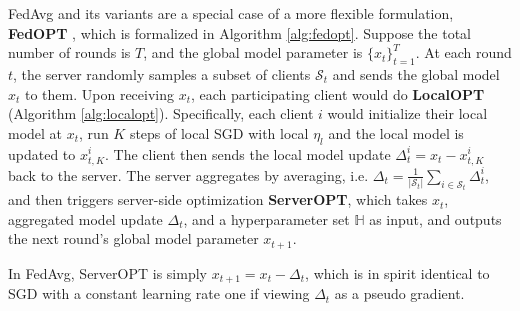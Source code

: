 FedAvg \citep{McMahan2017FedAvg} and its variants are a special case of a more flexible formulation, \textbf{FedOPT} \citep{reddi2020adaptive}, which is formalized in Algorithm \ref{alg:fedopt}. Suppose the total number of rounds is $T$, and the global model parameter is $\{x_t\}_{t=1}^T$. At each round $t$, the server randomly samples a subset of clients $\mathcal{S}_t$ and sends the global model $x_t$ to them. Upon receiving $x_t$, each participating client would do \textbf{LocalOPT} (Algorithm \ref{alg:localopt}). Specifically, each client $i$ would initialize their local model at $x_t$, run $K$ steps of local SGD with local $\eta_l$ and the local model is updated to $x_{t,K}^i$. The client then sends the local model update $\Delta_t^i=x_t-x_{t,K}^i$ back to the server. The server aggregates by averaging, i.e. $\Delta_t=\frac{1}{\lvert \mathcal{S}_t\rvert}\sum_{i\in \mathcal{S}_t}\Delta_t^i$, and then triggers server-side optimization \textbf{ServerOPT}, which takes $x_t$, aggregated model update $\Delta_t$, and a hyperparameter set $\mathbb{H}$ as input, and outputs the next round's global model parameter $x_{t+1}$.

In FedAvg, ServerOPT is simply $x_{t+1} = x_t - \Delta_t$, which is in spirit identical to SGD with a constant learning rate one if viewing $\Delta_t$ as a pseudo gradient. 










